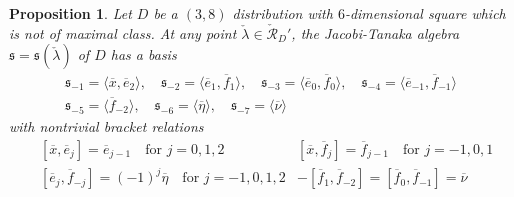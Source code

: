 \documentclass[11pt,letterpaper]{amsart}
\newtheorem{prop}[theorem]{Proposition}
\numberwithin{equation}{section}
\newcommand{\oline}{\overline}
\begin{document}
\begin{prop}
    \label{Prop: (3,8) Nonmax Jacobi Alg}
    Let $D$ be a $(3,8)$ distribution with $6$-dimensional square which is not of maximal class. At any point ${\check\lambda} \in \check{\mathcal{R}}_D'$, the Jacobi-Tanaka algebra ${\mathfrak s}={\mathfrak s}({\check\lambda})$ of $D$ has a basis
    \begin{gather}
        \mathfrak s_{-1} = \langle \oline x,\oline e_2\rangle, \quad\mathfrak s_{-2} = \langle \oline e_1,\oline f_1\rangle,\quad \mathfrak s_{-3} = \langle \oline e_{0},\oline f_{0}\rangle,\quad \mathfrak s_{-4} = \langle \oline e_{-1},\oline f_{-1}\rangle
        \\
        \mathfrak s_{-5} = \langle \oline f_{-2}\rangle,\quad \mathfrak s_{-6} = \langle \oline \eta\rangle, \quad \mathfrak s_{-7} = \langle \oline \nu\rangle
    \end{gather}
    with nontrivial bracket relations
    \begin{align}
        & \label{JacobiRel1}
        [\oline x, \oline e_j] = \oline e_{j-1} \quad \text{for }j=0,1,2
        & [\oline x, \oline f_j] = \oline f_{j-1} \quad \text{for }j=-1,0,1
        \\
        \label{JacobiRel2}
       & [\oline e_j,\oline f_{-j}] = (-1)^j\oline \eta \quad\text{for }j=-1,0,1,2
        &-[\oline f_{1}, \oline f_{-2}] = [\oline f_{0}, \oline f_{-1}] = \oline \nu
    \end{align}
\end{prop}
\end{document}
